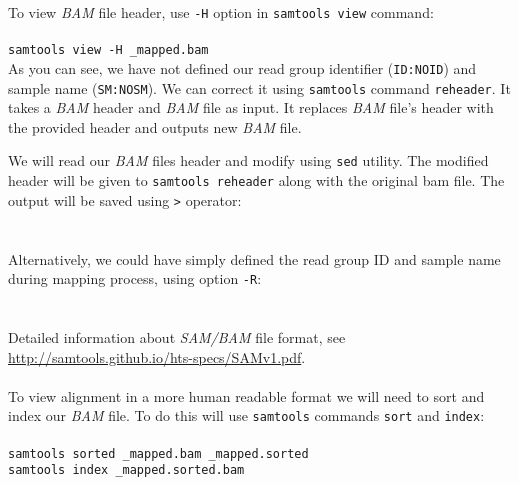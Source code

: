 To view \textit{BAM} file header, use 
\texttt{-H} option in \texttt{samtools view} command:\\~\\
\texttt{samtools view -H \mapReads\_mapped.bam}\\

As you can see, we have not defined our read group identifier (\texttt{ID:NOID})
and sample name (\texttt{SM:NOSM}). We can correct it using \texttt{samtools}
command \texttt{reheader}. It takes a \textit{BAM} header and \textit{BAM} file
as input. It replaces \textit{BAM} file's header with the provided header and 
outputs new \textit{BAM} file.

We will read our \textit{BAM} files header and modify using \texttt{sed}
utility. The modified header will be given to \texttt{samtools reheader}
along with the original bam file. The output will be saved using \texttt{>}
operator:\\~\\
\\

Alternatively, we could have simply defined the read group ID and sample name during mapping process,
using option \texttt{-R}:\\~\\%
\\


Detailed information about \textit{SAM/BAM} file format, see \url{http://samtools.github.io/hts-specs/SAMv1.pdf}.\\~\\

To view alignment in a more human readable format we will need to sort and index
our \textit{BAM} file. To do this will use \texttt{samtools} commands 
\texttt{sort} and \texttt{index}:\\~\\

\texttt{samtools sorted \mapReads\_mapped.bam \mapReads\_mapped.sorted}\\
\texttt{samtools index \mapReads\_mapped.sorted.bam}\\
